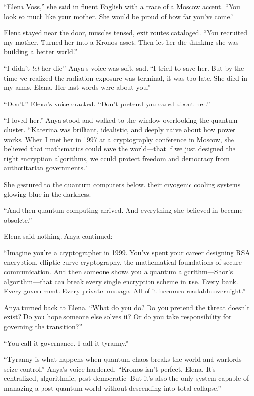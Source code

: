 \documentclass[12pt,letterpaper]{book}
\begin{document}
``Elena Voss,'' she said in fluent English with a trace of a Moscow accent. ``You look so much like your mother. She would be proud of how far you've come.''

Elena stayed near the door, muscles tensed, exit routes cataloged. ``You recruited my mother. Turned her into a Kronos asset. Then let her die thinking she was building a better world.''

``I didn't \emph{let} her die.'' Anya's voice was soft, sad. ``I tried to save her. But by the time we realized the radiation exposure was terminal, it was too late. She died in my arms, Elena. Her last words were about you.''

``Don't.'' Elena's voice cracked. ``Don't pretend you cared about her.''

``I loved her.'' Anya stood and walked to the window overlooking the quantum cluster. ``Katerina was brilliant, idealistic, and deeply naive about how power works. When I met her in 1997 at a cryptography conference in Moscow, she believed that mathematics could save the world---that if we just designed the right encryption algorithms, we could protect freedom and democracy from authoritarian governments.''

She gestured to the quantum computers below, their cryogenic cooling systems glowing blue in the darkness.

``And then quantum computing arrived. And everything she believed in became obsolete.''

Elena said nothing. Anya continued:

``Imagine you're a cryptographer in 1999. You've spent your career designing RSA encryption, elliptic curve cryptography, the mathematical foundations of secure communication. And then someone shows you a quantum algorithm---Shor's algorithm---that can break every single encryption scheme in use. Every bank. Every government. Every private message. All of it becomes readable overnight.''

Anya turned back to Elena. ``What do you do? Do you pretend the threat doesn't exist? Do you hope someone else solves it? Or do you take responsibility for governing the transition?''

``You call it governance. I call it tyranny.''

``Tyranny is what happens when quantum chaos breaks the world and warlords seize control.'' Anya's voice hardened. ``Kronos isn't perfect, Elena. It's centralized, algorithmic, post-democratic. But it's also the only system capable of managing a post-quantum world without descending into total collapse.''
\end{document}
